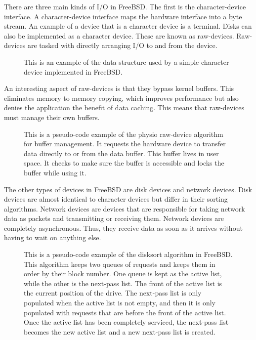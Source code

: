 \documentclass[journal,letterpaper,draftclsnofoot,onecolumn,10pt]{IEEEtran}
\begin{document}
There are three main kinds of I/O in FreeBSD. The first is the character-device interface. A character-device interface maps the hardware interface into a byte stream. An example of a device that is a character device is a terminal. Disks can also be implemented as a character device. These are known as raw-devices. Raw-devices are tasked with directly arranging I/O to and from the device.\cite{mn15}

\begin{figure}[H]
    
    \caption{This is an example of the data structure used by a simple character device implemented in FreeBSD.}
\end{figure}

An interesting aspect of raw-devices is that they bypass kernel buffers. This eliminates memory to memory copying, which improves performance but also denies the application the benefit of data caching. This means that raw-devices must manage their own buffers.\cite{mn15}

\begin{figure}[H]
   
   \caption{This is a pseudo-code example of the physio raw-device algorithm for buffer management. It requests the hardware device to transfer data directly to or from the data buffer. This buffer lives in user space. It checks to make sure the buffer is accessible and locks the buffer while using it.}
\end{figure}

The other types of devices in FreeBSD are disk devices and network devices. Disk devices are almost identical to character devices but differ in their sorting algorithms. Network devices are devices that are responsible for taking network data as packets and transmitting or receiving them. Network devices are completely asynchronous. Thus, they receive data as soon as it arrives without having to wait on anything else.\cite{mn15}

\begin{figure}[H]
   
   \caption{This is a pseudo-code example of the disksort algorithm in FreeBSD. This algorithm keeps two queues of requests and keeps them in order by their block number. One queue is kept as the active list, while the other is the next-pass list. The front of the active list is the current position of the drive. The next-pass list is only populated when the active list is not empty, and then it is only populated with requests that are before the front of the active list. Once the active list has been completely serviced, the next-pass list becomes the new active list and a new next-pass list is created.}
\end{figure}
\end{document}
